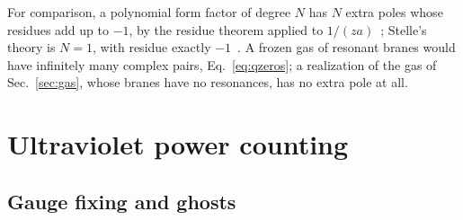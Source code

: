\documentclass[a4paper,11pt]{article}
\begin{document}
For comparison, a polynomial form factor of degree $N$ has $N$ extra poles whose residues add up to $-1$, by the residue theorem applied to $1/(za)$~\cite{Shapiro2015}; Stelle's theory is $N=1$, with residue exactly $-1$~\cite{Stelle1977}. A frozen gas of resonant branes would have infinitely many complex pairs, Eq.~\eqref{eq:qzeros}; a realization of the gas of Sec.~\ref{sec:gas}, whose branes have no resonances, has no extra pole at all.

\section{Ultraviolet power counting}
\label{sec:power}

\subsection{Gauge fixing and ghosts}
\label{sec:gf}
\end{document}
